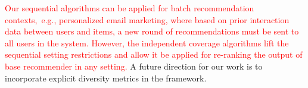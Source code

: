 \textcolor{red}{Our  sequential  algorithms can be applied for batch recommendation contexts,~e.g., personalized email marketing, where based on prior interaction data between users and items,  a new round of recommendations must be sent to all users in the system.  However, the independent coverage algorithms lift the sequential setting restrictions and allow it be applied for re-ranking the output of base recommender in any setting. }A future direction for our work is to incorporate explicit diversity metrics in the framework. 
\fi



